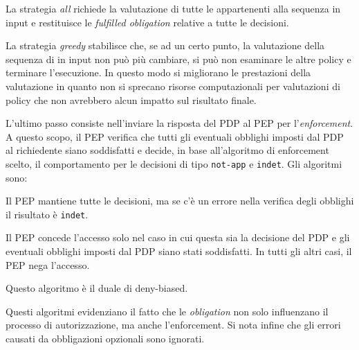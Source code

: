 \begin{description}[labelindent=5pt,style=multiline,leftmargin=3cm]
  \item[All]La strategia \emph{all} richiede la valutazione di tutte le \epolicy appartenenti alla sequenza in input e
            restituisce le \emph{fulfilled obligation} relative a tutte le decisioni.
  \item[Greedy]La strategia \emph{greedy} stabilisce che, se ad un certo punto, la valutazione della sequenza di \epolicy
               in input non può più cambiare, si può non esaminare le altre policy e terminare l'esecuzione. In questo modo
               si migliorano le prestazioni della valutazione in quanto non si sprecano risorse computazionali
               per valutazioni di policy che non avrebbero alcun impatto sul risultato finale.
\end{description}\par
L'ultimo passo consiste nell'inviare la risposta del \ac{PDP} al \ac{PEP} per l'\emph{enforcement}. A questo scopo, il \ac{PEP} verifica
che tutti gli eventuali obblighi imposti dal \ac{PDP} al richiedente siano soddisfatti e decide, in base all'algoritmo di
enforcement scelto, il comportamento per le decisioni di tipo \texttt{not-app} e \texttt{indet}. Gli algoritmi sono:
\begin{description}[labelindent=5pt,style=multiline,leftmargin=4cm]
  \item[base]Il \ac{PEP} mantiene tutte le decisioni, ma se c'è un errore nella verifica degli obblighi il risultato è \texttt{indet}.
  \item[deny-biased]Il \ac{PEP} concede l'accesso solo nel caso in cui questa sia la decisione del \ac{PDP} e gli eventuali obblighi imposti dal \ac{PDP} siano stati soddisfatti. In tutti gli altri casi, il \ac{PEP} nega l’accesso.
  \item[permit-biased]
  Questo algoritmo è il duale di deny-biased.
\end{description}
Questi algoritmi evidenziano il fatto che le \emph{obligation} non solo influenzano il processo di autorizzazione, ma anche l'enforcement.
Si nota infine che gli errori causati da obbligazioni opzionali sono ignorati.


